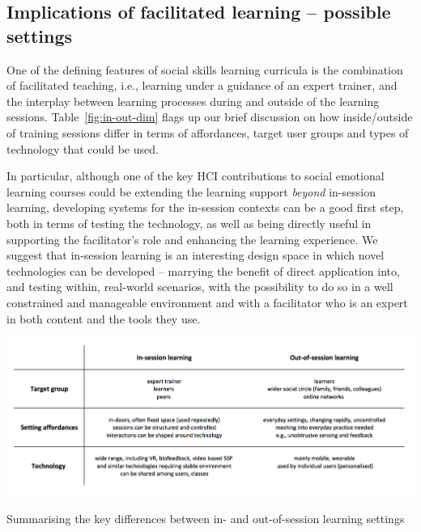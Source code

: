 \documentclass[prodmode,acmtochi]{acmsmall}
\begin{document}
\subsection{Implications of facilitated learning -- possible settings}
\label{sec:facilitated}

One of the defining features of social skills learning curricula is the combination of facilitated teaching, i.e., learning under a guidance of an expert trainer, and the interplay between learning processes during and outside of the learning sessions. 
Table~\ref{fig:in-out-dim} flags up our brief discussion on how inside/outside of training sessions differ in terms of affordances, target user groups and types of technology that could be used. 

In particular, although one of the key HCI contributions to social emotional learning courses could be extending the learning support \emph{beyond} in-session learning, developing systems for the in-session contexts can be a good first step, both in terms of testing the technology, as well as being directly useful in supporting the facilitator's role and enhancing the learning experience. We suggest that in-session learning is an interesting design space in which novel technologies can be developed -- marrying the benefit of direct application into, and testing within, real-world scenarios, with the possibility to do so in a well constrained and manageable environment and with a facilitator who is an expert in both content and the tools they use.   




\begin{table}
  \centering
        \includegraphics[width=\textwidth]{images/in-out.png}
        \caption{Summarising the key differences between in- and out-of-session learning settings}
        \label{fig:in-out-dim}
\end{table}
\end{document}
